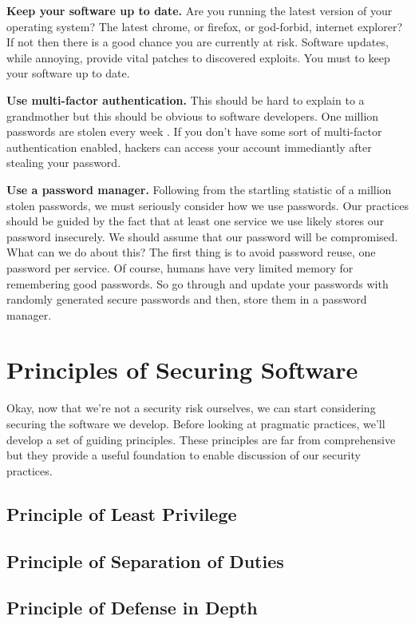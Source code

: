 \documentclass{csse4400}
\begin{document}
\textbf{Keep your software up to date.}
Are you running the latest version of your operating system?
The latest chrome, or firefox, or god-forbid, internet explorer?
If not then there is a good chance you are currently at risk.
Software updates, while annoying, provide vital patches to discovered exploits.
You must to keep your software up to date.

\textbf{Use multi-factor authentication.}
This should be hard to explain to a grandmother but this should be obvious to software developers.
One million passwords are stolen every week \cite{password-security}.
If you don't have some sort of multi-factor authentication enabled, hackers can access your account immediantly after stealing your password.

\textbf{Use a password manager.}
Following from the startling statistic of a million stolen passwords, we must seriously consider how we use passwords.
Our practices should be guided by the fact that at least one service we use likely stores our password insecurely.
We should assume that our password will be compromised.
What can we do about this?
The first thing is to avoid password reuse, one password per service.
Of course, humans have very limited memory for remembering good passwords.
So go through and update your passwords with randomly generated secure passwords and then, store them in a password manager.


\section{Principles of Securing Software}
Okay, now that we're not a security risk ourselves, we can start considering securing the software we develop.
Before looking at pragmatic practices, we'll develop a set of guiding principles.
These principles are far from comprehensive but they provide a useful foundation to enable discussion of our security practices.

\subsection{Principle of Least Privilege}
\subsection{Principle of Separation of Duties}
\subsection{Principle of Defense in Depth}
\end{document}
